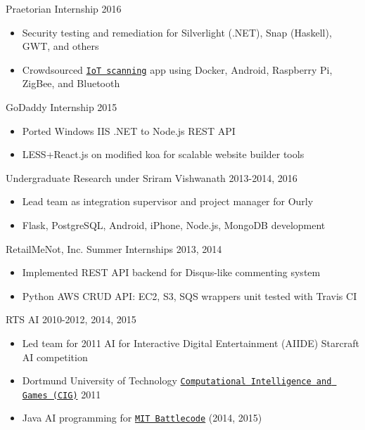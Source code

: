 \documentclass[line,margin]{res}
\begin{document}
\begin{resume}
    \vspace{-8pt}
    Praetorian Internship
    \hfill  2016
        \begin{itemize} \itemsep -2pt
        \item Security testing and remediation for Silverlight (.NET), Snap (Haskell), GWT, and others
        \item Crowdsourced \href{https://iotmap.io}{\texttt{IoT scanning}} app using 
            Docker, Android, Raspberry Pi, ZigBee, and Bluetooth
        \end{itemize}

    \vspace{-8pt}
    GoDaddy Internship
    \hfill  2015
        \begin{itemize} \itemsep -2pt
        \item Ported Windows IIS .NET to Node.js REST API
        \item LESS+React.js on modified koa for scalable website builder tools
        \end{itemize}

    \vspace{-8pt}
    Undergraduate Research under Sriram Vishwanath
    \hfill  2013-2014, 2016
        \begin{itemize} \itemsep -2pt
        \item Lead team as integration supervisor and project manager for Ourly
        \item Flask, PostgreSQL, Android, iPhone, Node.js, MongoDB development
        \end{itemize}

    \vspace{-8pt}
    RetailMeNot, Inc. Summer Internships
    \hfill  2013, 2014
        \begin{itemize} \itemsep -2pt
        \item Implemented REST API backend for Disqus-like commenting system
        \item Python AWS CRUD API: EC2, S3, SQS wrappers unit tested with Travis CI
        \end{itemize}

    \vspace{-8pt}
    RTS AI
    \hfill  2010-2012, 2014, 2015
        \begin{itemize} \itemsep -2pt
        \item Led team for 2011 AI for Interactive Digital Entertainment (AIIDE) Starcraft AI competition  
        \item Dortmund University of Technology \href{https://www.s11-www.cs.uni-dortmund.de/rts-competition/starcraft-cig2011}{\texttt{Computational Intelligence and Games (CIG)}} 2011
        \item Java AI programming for \href{http://www.battlecode.org/}{\texttt{MIT Battlecode}} (2014, 2015)
        \end{itemize}



\end{resume}
\end{document}
